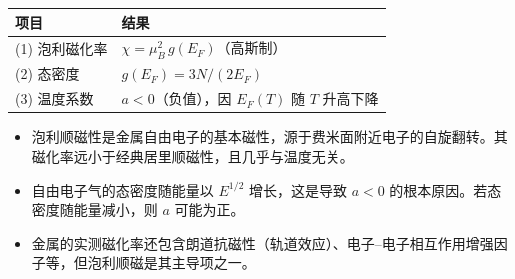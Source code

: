 \begin{formulabox}[答案汇总]
\begin{center}
\begin{tabular}{ll}
\toprule
\textbf{项目} & \textbf{结果} \\
\midrule
(1) 泡利磁化率 & $\chi=\mu_B^2\,g(E_F)$（高斯制） \\
(2) 态密度 & $g(E_F)=3N/(2E_F)$ \\
(3) 温度系数 & $a<0$（负值），因 $E_F(T)$ 随 $T$ 升高下降 \\
\bottomrule
\end{tabular}
\end{center}
\end{formulabox}

\begin{insightbox}[物理图像]
\begin{itemize}
    \item 泡利顺磁性是金属自由电子的基本磁性，源于费米面附近电子的自旋翻转。其磁化率远小于经典居里顺磁性，且几乎与温度无关。
    \item 自由电子气的态密度随能量以 $E^{1/2}$ 增长，这是导致 $a<0$ 的根本原因。若态密度随能量减小，则 $a$ 可能为正。
    \item 金属的实测磁化率还包含朗道抗磁性（轨道效应）、电子--电子相互作用增强因子等，但泡利顺磁是其主导项之一。
\end{itemize}
\end{insightbox}
